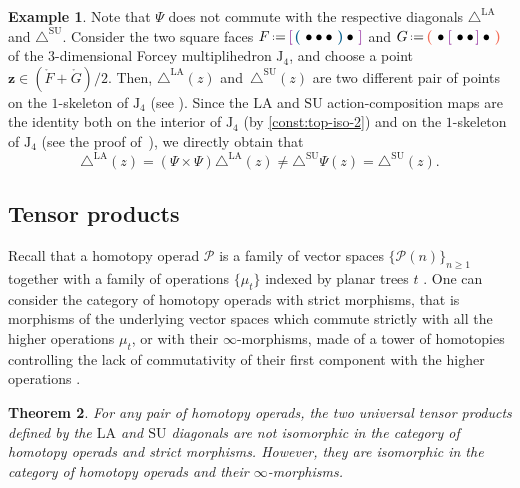 \documentclass{amsart}
\newtheorem{theorem}{Theorem}[section]
\theoremstyle{definition}
\newtheorem{example}[theorem]{Example}
\renewcommand{\b}[1]{{\boldsymbol{#1}}} %
\newcommand{\J}{\mathrm{J}} %
\newcommand{\eqdef}{\mbox{\,\raisebox{0.2ex}{\scriptsize\ensuremath{\mathrm:}}\ensuremath{=}\,}} %
\newcommand{\bluea}[1]{\textcolor{MidnightBlue}{\boldsymbol{\left(\right.}} #1 \textcolor{MidnightBlue}{\boldsymbol{\left.\right)}}}
\newcommand{\reda}[1]{\textcolor{Red!60}{\boldsymbol{\left(\right.}} #1 \textcolor{Red!60}{\boldsymbol{\left.\right)}}}
\newcommand{\purplea}[1]{\textcolor{Purple!80}{\boldsymbol{\left[\right.}} #1 \textcolor{Purple!80}{\boldsymbol{\left.\right]}}}
\renewcommand{\b}[1]{\boldsymbol{#1}} %
\newcommand{\SU}{\mathrm{SU}}
\newcommand{\LA}{\mathrm{LA}}
\newcommand{\SUD}{\triangle^{\mathrm{SU}}}
\newcommand{\LAD}{\triangle^{\mathrm{LA}}}
\begin{document}
\begin{example}
	\label{ex:iso-not-Hopf-2}
	Note that $\Psi$ does not commute with the respective diagonals $\LAD$ and $\SUD$. 
	Consider the two square faces $F \eqdef \purplea{\bluea{\bullet \bullet \bullet}\bullet}$ and $G \eqdef \reda{\bullet\purplea{\bullet\bullet}\bullet}$ of the $3$-dimensional Forcey multiplihedron $\J_4$, and choose a point $\b z \in (\mathring F + \mathring G)/2$.
	Then, $\LAD(z)$ and~$\SUD(z)$ are two different pair of points on the $1$-skeleton of $\J_4$ (see \cite[Ex.~3.7 \& Fig.~9]{LaplanteAnfossiMazuir}). 
	Since the $\LA$ and $\SU$ action-composition maps are the identity both on the interior of $\J_4$ (by \cref{const:top-iso-2}) and on the $1$-skeleton of $\J_4$ (see the proof of~\cite[Prop. 7]{MasudaThomasTonksVallette}), we directly obtain that
	\[
	{\LAD(z)=(\Psi \times \Psi)\LAD(z) \neq \SUD \Psi(z)=\SUD(z)}.
	\] 
\end{example}



\subsection{Tensor products}
\label{subsec:tensor-products}
Recall that a homotopy operad $\mathcal{P}$ is a family of vector spaces $\{\mathcal{P}(n)\}_{n \geq 1}$ together with a family of operations $\{\mu_t\}$ indexed by planar trees $t$ \cite[Def. 4.11]{LaplanteAnfossi}.
One can consider the category of homotopy operads with strict morphisms, that is morphisms of the underlying vector spaces which commute strictly with all the higher operations $\mu_t$, or with their $\infty$-morphisms, made of a tower of homotopies controlling the lack of commutativity of their first component with the higher operations \cite[Sec. 10.5.2]{LodayVallette}.

\begin{theorem}
\label{thm:infinity-iso}
For any pair of homotopy operads, the two universal tensor products defined by the $\LA$ and $\SU$ diagonals are not isomorphic in the category of homotopy operads and strict morphisms.
However, they are isomorphic in the category of homotopy operads and their $\infty$-morphisms.
\end{theorem}
\end{document}
